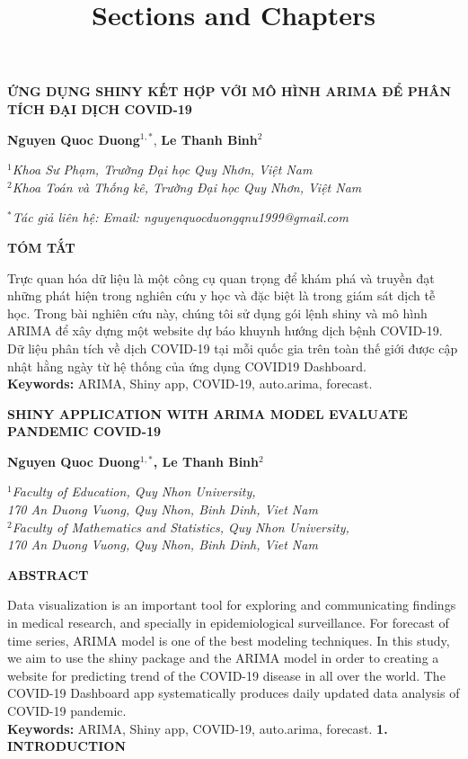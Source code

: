 \documentclass[12pt, a4paper,oneside]{book}
\title{Sections and Chapters}
\theoremstyle{definition}
\begin{document}
\begin{center}
\textbf{ỨNG DỤNG SHINY KẾT HỢP VỚI MÔ HÌNH ARIMA ĐỂ PHÂN TÍCH ĐẠI DỊCH COVID-19}
\end{center}
\begin{center}
\textbf{Nguyen Quoc Duong$^{1, *}$}, \textbf{Le Thanh Binh$^{2}$}
\end{center}
\begin{center}
\textit{$^{1}$Khoa Sư Phạm, Trường Đại học Quy Nhơn, Việt Nam}\\
\textit{$^{2}$Khoa Toán và Thống kê, Trường Đại học Quy Nhơn, Việt Nam}
\end{center}
\begin{center}
\textit{$^{*}$Tác giả liên hệ: Email: nguyenquocduongqnu1999@gmail.com}
\end{center}
\textbf{TÓM TẮT}

Trực quan hóa dữ liệu là một công cụ quan trọng để khám phá và truyền đạt những phát hiện trong nghiên cứu y học và đặc biệt là trong giám sát dịch tễ học. Trong bài nghiên cứu này, chúng tôi sử dụng gói lệnh shiny và mô hình ARIMA để xây dựng một website dự báo khuynh hướng dịch bệnh COVID-19. Dữ liệu phân tích về dịch COVID-19 tại mỗi quốc gia trên toàn thế giới được cập nhật hằng ngày từ hệ thống của ứng dụng COVID19 Dashboard.\\
\textbf{Keywords:} ARIMA, Shiny app, COVID-19, auto.arima, forecast.
\newpage
\begin{center}
	\textbf{SHINY APPLICATION WITH ARIMA MODEL EVALUATE PANDEMIC COVID-19}
\end{center}
\begin{center}
	\textbf{Nguyen Quoc Duong$^{1, *}$, Le Thanh Binh$^{2}$}
\end{center}
\begin{center}
	\textit{{$^{1}$Faculty of Education, Quy Nhon University,\\ 170 An Duong Vuong, Quy Nhon, Binh Dinh, Viet Nam}}\\
	\textit{$^{2}$Faculty of Mathematics and Statistics, Quy Nhon University,\\ 170 An Duong Vuong, Quy Nhon, Binh Dinh, Viet Nam}
	
\end{center}
\textbf{ABSTRACT}

Data visualization is an important tool for exploring and communicating findings in medical research, and specially in epidemiological surveillance. For forecast of time series, ARIMA model is one of the best modeling techniques. In this study, we aim to use the shiny package and the ARIMA model in order to creating a website for predicting trend of the COVID-19 disease  in all over the world. The COVID-19 Dashboard app systematically produces daily updated data analysis of COVID-19 pandemic.\\
\textbf{Keywords:} ARIMA, Shiny app, COVID-19, auto.arima, forecast.
\vskip 0.5cm
\noindent 
{\bf 1. INTRODUCTION}
\end{document}
